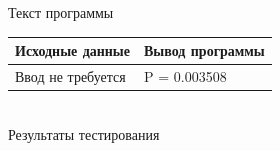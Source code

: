 \documentclass[a4paper,14pt]{extarticle}
\begin{document}

\begin{center}
Текст программы
\end{center}
\begin{center}
\begin{tabular}{|p{7cm}|p{7cm}|}
\hline
\multicolumn{1}{|c|}{Исходные данные}& \multicolumn{1}{|c|}{Вывод программы}\\
\hline
Ввод не требуется & P = 0.003508\\
\hline
\end{tabular}\\
\vspace{0.3cm}
Результаты тестирования
\end{center}
\end{document}
